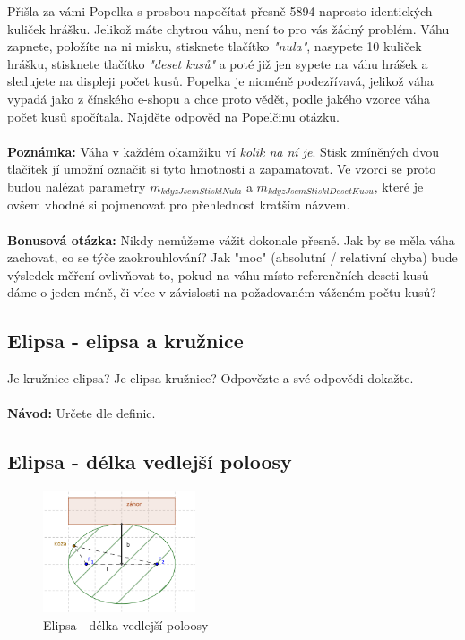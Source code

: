\documentclass[a4paper,12pt]{article}
\begin{document}
Přišla za vámi Popelka s prosbou napočítat přesně 5894 naprosto identických kuliček hrášku. Jelikož máte chytrou váhu, není to pro vás žádný problém. Váhu zapnete, položíte na ni misku, stisknete tlačítko \textit{"nula"}, nasypete 10 kuliček hrášku, stisknete tlačítko \textit{"deset kusů"} a poté již jen sypete na váhu hrášek a sledujete na displeji počet kusů. Popelka je nicméně podezřívavá, jelikož váha vypadá jako z čínského e-shopu a chce proto vědět, podle jakého vzorce váha počet kusů spočítala. Najděte odpověď na Popelčinu otázku.
\\ \\
\textbf{Poznámka:} Váha v každém okamžiku ví \textit{kolik na ní je}. Stisk zmíněných dvou tlačítek jí umožní označit si tyto hmotnosti a zapamatovat. Ve vzorci se proto budou nalézat parametry $m_{kdyzJsemStisklNula}$ a $m_{kdyzJsemStisklDesetKusu}$, které je ovšem vhodné si pojmenovat pro přehlednost kratším názvem.
\\ \\ 
\textbf{Bonusová otázka:} Nikdy nemůžeme vážit dokonale přesně. Jak by se měla váha zachovat, co se týče zaokrouhlování? Jak "moc" (absolutní / relativní chyba) bude výsledek měření ovlivňovat to, pokud na váhu místo referenčních deseti kusů dáme o jeden méně, či více v závislosti na požadovaném váženém počtu kusů?

\newpage

\subsection{Elipsa - elipsa a kružnice}

Je kružnice elipsa? Je elipsa kružnice? Odpovězte a své odpovědi dokažte.
\\ \\
\textbf{Návod:} Určete dle definic.

\subsection{Elipsa - délka vedlejší poloosy}

\begin{figure}[H]
  \begin{center}
    \includegraphics[width=0.4\textwidth]{data/elipsa-koza.png}
  \end{center}
  \caption{Elipsa - délka vedlejší poloosy}
\end{figure}
\end{document}

